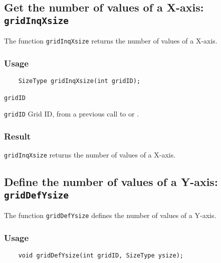 \subsection{Get the number of values of a X-axis: \texttt{gridInqXsize}}
\label{gridInqXsize}

The function {\texttt{gridInqXsize}} returns the number of values of a X-axis.

\subsubsection*{Usage}

\begin{verbatim}
    SizeType gridInqXsize(int gridID);
\end{verbatim}

\hspace*{4mm}\begin{minipage}[]{15cm}
\begin{deflist}{\texttt{gridID}\ }
\item[\texttt{gridID}]
Grid ID, from a previous call to {} or {}.

\end{deflist}
\end{minipage}

\subsubsection*{Result}

{\texttt{gridInqXsize}} returns the number of values of a X-axis.



\subsection{Define the number of values of a Y-axis: \texttt{gridDefYsize}}
\label{gridDefYsize}

The function {\texttt{gridDefYsize}} defines the number of values of a Y-axis.

\subsubsection*{Usage}

\begin{verbatim}
    void gridDefYsize(int gridID, SizeType ysize);
\end{verbatim}

